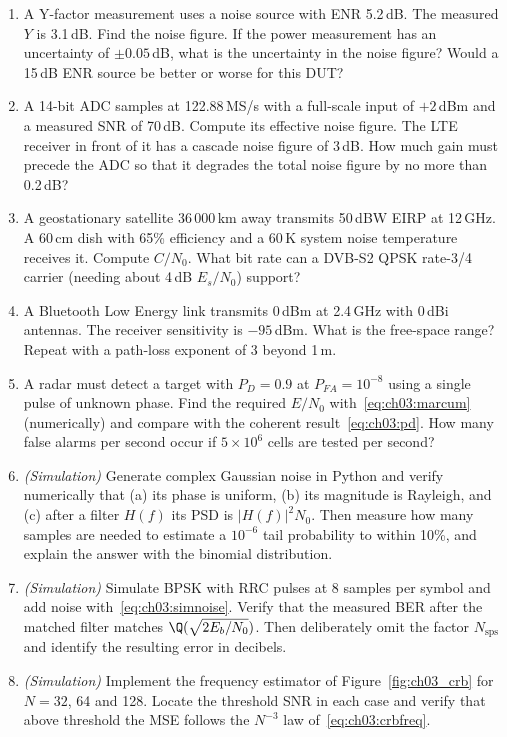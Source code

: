 \begin{enumerate}[label=\thechapter.\arabic*]
temperature, and the noise temperature~\eqref{eq:ch03:lossy} of a matched attenuator from the
thermal-equilibrium argument.
\item A Y-factor measurement uses a noise source with ENR 5.2\,dB. The measured $Y$ is 3.1\,dB. Find the noise
figure. If the power measurement has an uncertainty of $\pm0.05$\,dB, what is the uncertainty in the noise
figure? Would a 15\,dB ENR source be better or worse for this DUT?
\item A 14-bit ADC samples at 122.88\,MS/s with a full-scale input of $+2$\,dBm and a measured SNR of 70\,dB.
Compute its effective noise figure. The LTE receiver in front of it has a cascade noise figure of 3\,dB. How
much gain must precede the ADC so that it degrades the total noise figure by no more than 0.2\,dB?
\item A geostationary satellite 36\,000\,km away transmits 50\,dBW EIRP at 12\,GHz. A 60\,cm dish with 65\%
efficiency and a 60\,K system noise temperature receives it. Compute $C/N_0$. What bit rate can a DVB-S2 QPSK
rate-3/4 carrier (needing about 4\,dB $E_s/N_0$) support?
\item A Bluetooth Low Energy link transmits 0\,dBm at 2.4\,GHz with 0\,dBi antennas. The receiver sensitivity
is $-95$\,dBm. What is the free-space range? Repeat with a path-loss exponent of 3 beyond 1\,m.
\item A radar must detect a target with $P_D=0.9$ at $P_{FA}=10^{-8}$ using a single pulse of unknown phase.
Find the required $E/N_0$ with~\eqref{eq:ch03:marcum} (numerically) and compare with the coherent
result~\eqref{eq:ch03:pd}. How many false alarms per second occur if $5\times10^6$ cells are tested per second?
\item \emph{(Simulation)} Generate complex Gaussian noise in Python and verify numerically that (a) its phase
is uniform, (b) its magnitude is Rayleigh, and (c) after a filter $H(f)$ its PSD is $|H(f)|^2N_0$. Then measure
how many samples are needed to estimate a $10^{-6}$ tail probability to within 10\%, and explain the answer
with the binomial distribution.
\item \emph{(Simulation)} Simulate BPSK with RRC pulses at 8 samples per symbol and add noise
with~\eqref{eq:ch03:simnoise}. Verify that the measured BER after the matched filter matches
$\Q(\sqrt{2E_b/N_0})$. Then deliberately omit the factor $N_{\text{sps}}$ and identify the resulting error in
decibels.
\item \emph{(Simulation)} Implement the frequency estimator of Figure~\ref{fig:ch03_crb} for $N=32$, 64 and
128. Locate the threshold SNR in each case and verify that above threshold the MSE follows the $N^{-3}$ law
of~\eqref{eq:ch03:crbfreq}.
\end{enumerate}

